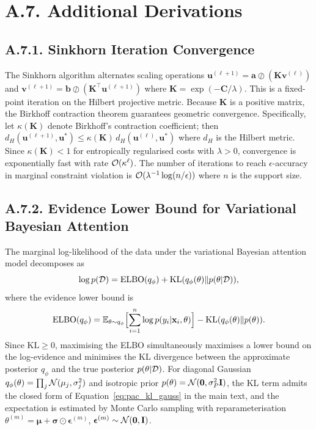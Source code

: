 \section*{A.7. Additional Derivations}
\label{app:additional}

\subsection*{A.7.1. Sinkhorn Iteration Convergence}
\label{app:sinkhorn}

The Sinkhorn algorithm alternates scaling operations $\mathbf{u}^{(\ell+1)}=\mathbf{a}\oslash(\mathbf{K}\mathbf{v}^{(\ell)})$ and $\mathbf{v}^{(\ell+1)}=\mathbf{b}\oslash(\mathbf{K}^\top\mathbf{u}^{(\ell+1)})$ where $\mathbf{K}=\exp(-\mathbf{C}/\lambda)$. This is a fixed-point iteration on the Hilbert projective metric. Because $\mathbf{K}$ is a positive matrix, the Birkhoff contraction theorem guarantees geometric convergence. Specifically, let $\kappa(\mathbf{K})$ denote Birkhoff's contraction coefficient; then $d_H(\mathbf{u}^{(\ell+1)},\mathbf{u}^*)\le\kappa(\mathbf{K})\,d_H(\mathbf{u}^{(\ell)},\mathbf{u}^*)$ where $d_H$ is the Hilbert metric. Since $\kappa(\mathbf{K})<1$ for entropically regularised costs with $\lambda>0$, convergence is exponentially fast with rate $\mathcal{O}(\kappa^{\ell})$. The number of iterations to reach $\epsilon$-accuracy in marginal constraint violation is $\mathcal{O}(\lambda^{-1}\log(n/\epsilon))$ where $n$ is the support size.


\subsection*{A.7.2. Evidence Lower Bound for Variational Bayesian Attention}
\label{app:elbo}

The marginal log-likelihood of the data under the variational Bayesian attention model decomposes as
\begin{equation}
\log p(\mathcal{D}) = \mathrm{ELBO}(q_\phi) + \mathrm{KL}(q_\phi(\theta)\|p(\theta|\mathcal{D})),
\end{equation}
where the evidence lower bound is
\begin{equation}
\mathrm{ELBO}(q_\phi) = \mathbb{E}_{\theta\sim q_\phi}\Bigl[\sum_{i=1}^n\log p(y_i|\mathbf{x}_i,\theta)\Bigr] - \mathrm{KL}(q_\phi(\theta)\|p(\theta)).
\end{equation}
Since $\mathrm{KL}\ge 0$, maximising the ELBO simultaneously maximises a lower bound on the log-evidence and minimises the KL divergence between the approximate posterior $q_\phi$ and the true posterior $p(\theta|\mathcal{D})$. For diagonal Gaussian $q_\phi(\theta)=\prod_j\mathcal{N}(\mu_j,\sigma_j^2)$ and isotropic prior $p(\theta)=\mathcal{N}(\mathbf{0},\sigma_P^2\mathbf{I})$, the KL term admits the closed form of Equation~\eqref{eq:pac_kl_gauss} in the main text, and the expectation is estimated by Monte Carlo sampling with reparameterisation $\theta^{(m)}=\bm{\mu}+\bm{\sigma}\odot\bm{\epsilon}^{(m)}$, $\bm{\epsilon}^{(m)}\sim\mathcal{N}(\mathbf{0},\mathbf{I})$.


